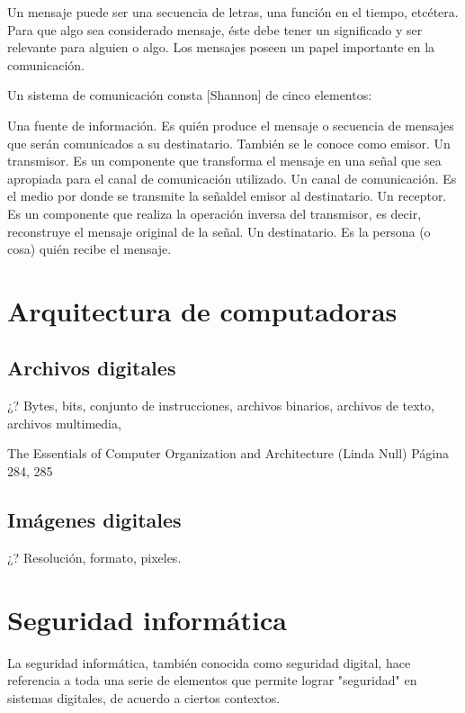 Un mensaje puede ser \citet{Shannon_Theory} una secuencia de letras, una funci{\'{o}}n en el tiempo, etc{\'{e}}tera. Para que algo sea considerado mensaje, {\'{e}}ste debe tener un significado y ser relevante para alguien o algo. Los mensajes poseen un papel importante en la comunicaci{\'{o}}n.

Un sistema de comunicaci{\'{o}}n consta [Shannon] de cinco elementos:

Una fuente de informaci{\'{o}}n. Es qui{\'{e}}n produce el mensaje o secuencia de mensajes que ser{\'{a}}n comunicados a su destinatario. Tambi{\'{e}}n se le conoce como emisor.
Un transmisor. Es un componente que transforma el mensaje en una señal que sea apropiada para el canal de comunicaci{\'{o}}n utilizado.
Un canal de comunicaci{\'{o}}n. Es el medio por donde se transmite la señaldel emisor al destinatario.
Un receptor. Es un componente que realiza la operaci{\'{o}}n inversa del transmisor, es decir, reconstruye el mensaje original de la señal.
Un destinatario. Es la persona (o cosa) qui{\'{e}}n recibe el mensaje.

\section{Arquitectura de computadoras}
\subsection{Archivos digitales}

¿? Bytes, bits, conjunto de instrucciones, archivos binarios, archivos de texto, archivos multimedia,

The Essentials of Computer Organization and Architecture (Linda Null) P{\'{a}}gina 284, 285

\subsection{Im{\'{a}}genes digitales}

¿? Resoluci{\'{o}}n, formato, pixeles.


\section{Seguridad inform{\'{a}}tica}

La seguridad inform{\'{a}}tica, tambi{\'{e}}n conocida como seguridad 
digital, hace referencia \citet{Secrets_Schneier} a toda una serie de elementos que permite lograr "seguridad" en sistemas digitales, de acuerdo a ciertos contextos.

